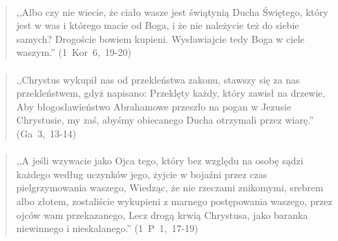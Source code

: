 \documentclass[10pt,a4paper,oneside]{article}
\begin{document}
\paragraph{}
\begin{quote}
,,Albo czy nie wiecie, że ciało wasze jest świątynią Ducha Świętego, który jest w was i którego macie od Boga, i że nie należycie też do siebie samych? Drogoście bowiem kupieni. Wysławiajcie tedy Boga w ciele waszym.'' \mbox{(1 Kor 6, 19-20)}
\end{quote}
\paragraph{}
\begin{quote}
,,Chrystus wykupił nas od przekleństwa zakonu, stawszy się za nas przekleństwem, gdyż napisano: Przeklęty każdy, który zawisł na drzewie, Aby błogosławieństwo Abrahamowe przeszło na pogan w Jezusie Chrystusie, my zaś, abyśmy obiecanego Ducha otrzymali przez wiarę.'' \mbox{(Ga 3, 13-14)}
\end{quote}
\paragraph{}
\begin{quote}
,,A jeśli wzywacie jako Ojca tego, który bez względu na osobę sądzi każdego według uczynków jego, żyjcie w bojaźni przez czas pielgrzymowania waszego, Wiedząc, że nie rzeczami znikomymi, srebrem albo złotem, zostaliście wykupieni z marnego postępowania waszego, przez ojców wam przekazanego, Lecz drogą krwią Chrystusa, jako baranka niewinnego i nieskalanego.'' \mbox{(1 P 1, 17-19)}
\end{quote}
\end{document}
